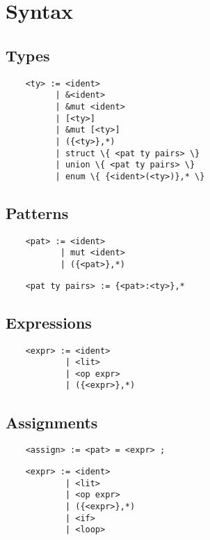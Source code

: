 \documentclass[a4paper]{article}
\begin{document}
\pagebreak

\section{Syntax}

\subsection{Types}

\begin{verbatim}
    <ty> := <ident>
          | &<ident>
          | &mut <ident>
          | [<ty>]
          | &mut [<ty>]
          | ({<ty>},*)
          | struct \{ <pat ty pairs> \}
          | union \{ <pat ty pairs> \}
          | enum \{ {<ident>(<ty>)},* \}
\end{verbatim}

\subsection{Patterns}

\begin{verbatim}
    <pat> := <ident>
           | mut <ident>
           | ({<pat>},*)
\end{verbatim}

\begin{verbatim}
    <pat ty pairs> := {<pat>:<ty>},*
\end{verbatim}

\subsection{Expressions}

\begin{verbatim}
    <expr> := <ident>
            | <lit>
            | <op expr>
            | ({<expr>},*)
\end{verbatim}

\subsection{Assignments}

\begin{verbatim}
    <assign> := <pat> = <expr> ;
\end{verbatim}

\begin{verbatim}
    <expr> := <ident>
            | <lit>
            | <op expr>
            | ({<expr>},*)
            | <if>
            | <loop>
\end{verbatim}
\end{document}
